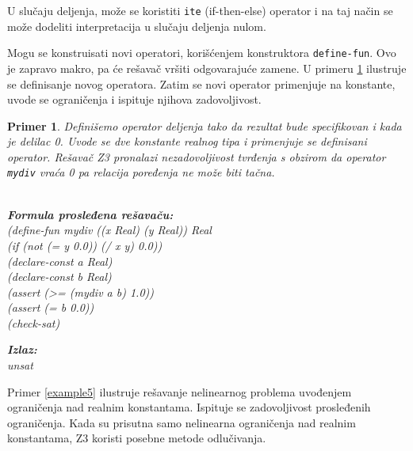 \documentclass[12pt,oneside]{memoir}
\newcommand\tab[1][0.5cm]{\hspace*{#1}}
\newtheorem{primer}{Primer}
\begin{document}
U slučaju deljenja, može se koristiti \texttt{ite} (if-then-else) operator i na taj način se može dodeliti interpretacija u slučaju deljenja nulom.
\par
Mogu se konstruisati novi operatori, korišćenjem konstruktora \texttt{define-fun}. Ovo je zapravo makro, pa će rešavač vršiti odgovarajuće zamene. U primeru \ref{example4} ilustruje se definisanje novog operatora. Zatim se novi operator primenjuje na konstante, uvode se ograničenja i ispituje njihova zadovoljivost.
\begin{primer} \label{example4}
Definišemo operator deljenja tako da rezultat bude specifikovan i kada je delilac 0. Uvode se dve konstante realnog tipa i primenjuje se definisani operator. Rešavač Z3 pronalazi nezadovoljivost tvrđenja s obzirom da operator \texttt{mydiv} vraća 0 pa relacija poređenja ne može biti tačna.\\ \\
\begin{minipage}[b]{0.5\textwidth}
\textbf{Formula prosleđena rešavaču:}
\\(define-fun mydiv ((x Real) (y Real)) Real
\\\tab (if (not (= y 0.0))  (/ x y)  0.0))
\\(declare-const a Real)
\\(declare-const b Real)
\\(assert (>= (mydiv a b) 1.0))
\\(assert (= b 0.0))
\\(check-sat)
\end{minipage}
\hspace{3cm}
\begin{minipage}[t]{0.4\textwidth}
\vspace{-4.73cm}
\textbf{Izlaz:}
\\unsat
\end{minipage}
\end{primer}
\par
Primer \ref{example5} ilustruje rešavanje nelinearnog problema uvođenjem ograničenja nad realnim konstantama. Ispituje se zadovoljivost prosleđenih ograničenja. Kada su prisutna samo nelinearna ograničenja nad realnim konstantama, Z3 koristi posebne metode odlučivanja.
\end{document}
